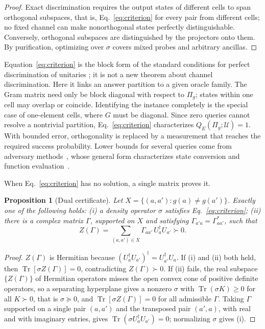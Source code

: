 \documentclass[
  aps,
  pra,
  reprint,
  nofootinbib
]{revtex4-2}
\newtheorem{proposition}{Proposition}
\begin{document}
\begin{proof}
Exact discrimination requires the output states of different cells to span
orthogonal subspaces, that is, Eq.~\eqref{eq:criterion} for every pair from
different cells; no fixed channel can make nonorthogonal states perfectly
distinguishable. Conversely, orthogonal subspaces are distinguished by the
projectors onto them. By purification, optimizing over \(\sigma\) covers mixed
probes and arbitrary ancillas.
\end{proof}

Equation~\eqref{eq:criterion} is the block form of the standard conditions for
perfect discrimination of unitaries
\cite{Acin2001UnitaryDiscrimination,DuanFengYing2009}; it is not a new theorem
about channel discrimination. Here it links an answer partition to a given
oracle family. The Gram matrix need only be block diagonal with respect to
\(\Pi_g\); states within one cell may overlap or coincide. Identifying the
instance completely is the special case of one-element cells, where \(G\) must
be diagonal. Since zero queries cannot resolve a nontrivial partition,
Eq.~\eqref{eq:criterion} characterizes \(Q_E(\Pi_g;\mathcal U)=1\). With
bounded error, orthogonality is replaced by a measurement that reaches the
required success probability. Lower bounds for several queries come from
adversary methods~\cite{Ambainis2002Adversary}, whose general form
characterizes state conversion and function
evaluation~\cite{LeeEtAl2011StateConversion,Reichardt2014SpanPrograms}.

When Eq.~\eqref{eq:criterion} has no solution, a single matrix proves it.

\begin{proposition}[Dual certificate]\label{prop:dual}
Let \(X=\{(a,a'):g(a)\neq g(a')\}\). Exactly one of the following holds:
(i) a density operator \(\sigma\) satisfies Eq.~\eqref{eq:criterion};
(ii) there is a complex matrix \(\Gamma\), supported on \(X\) and satisfying
\(\Gamma_{a'a}=\Gamma_{aa'}^*\), such that
\begin{equation}
 Z(\Gamma)=\sum_{(a,a')\in X}\Gamma_{aa'}\,U_a^\dagger U_{a'}\succ0 .
 \label{eq:dual-witness}
\end{equation}
\end{proposition}

\begin{proof}
\(Z(\Gamma)\) is Hermitian because \((U_a^\dagger U_{a'})^\dagger=
U_{a'}^\dagger U_a\). If (i) and (ii) both held, then
\(\operatorname{Tr}[\sigma Z(\Gamma)]=0\), contradicting \(Z(\Gamma)\succ0\).
If (ii) fails, the real subspace \(\{Z(\Gamma)\}\) of Hermitian operators misses
the open convex cone of positive definite operators, so a separating
hyperplane gives a nonzero \(\sigma\) with \(\operatorname{Tr}(\sigma K)\ge0\)
for all \(K\succ0\), that is \(\sigma\succeq0\), and
\(\operatorname{Tr}[\sigma Z(\Gamma)]=0\) for all admissible \(\Gamma\). Taking
\(\Gamma\) supported on a single pair \((a,a')\) and the transposed pair
\((a',a)\), with real and with imaginary entries, gives
\(\operatorname{Tr}(\sigma U_a^\dagger U_{a'})=0\); normalizing \(\sigma\) gives
(i).
\end{proof}
\end{document}
